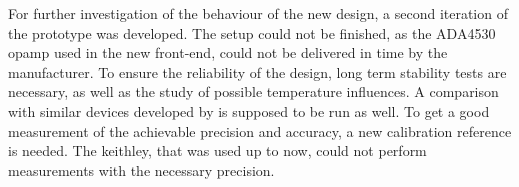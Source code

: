 For further investigation of the behaviour of the new design, a second iteration of the prototype was developed. The setup could not be finished, as the ADA4530 \ac{opamp} used in the new front-end, could not be delivered in time by the manufacturer. 
To ensure the reliability of the design, long term stability tests are necessary, as well as the study of possible temperature influences. A comparison with similar devices developed by \cite{zagreb} is supposed to be run as well. 
To get a good measurement of the achievable precision and accuracy, a new calibration reference is needed. The \ac{keithley}, that was used up to now, could not perform measurements with the necessary precision.


 